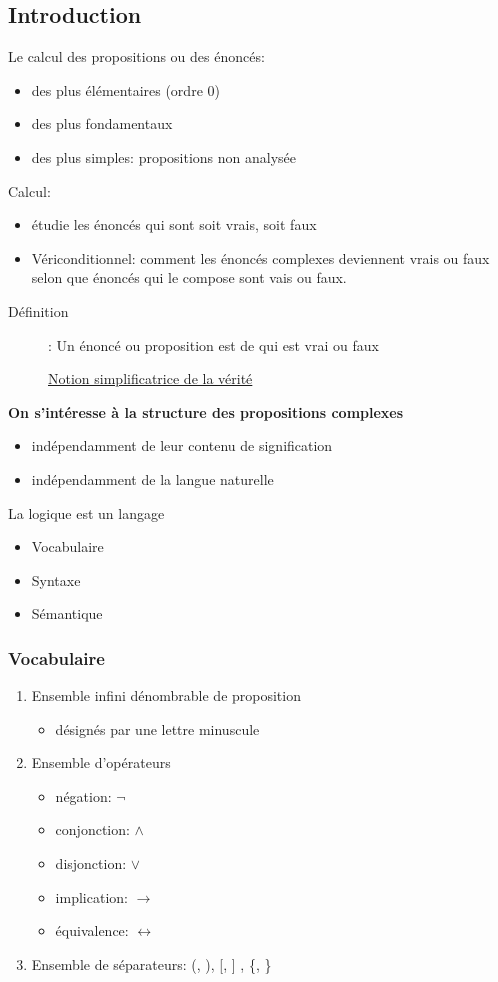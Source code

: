 \documentclass[10pt,a4paper]{article}
\begin{document}
\subsection{Introduction}
Le calcul des propositions ou des énoncés:\begin{itemize}
\item des plus élémentaires (ordre 0)
\item des plus fondamentaux
\item des plus simples: propositions non analysée
\end{itemize}
Calcul: \begin{itemize}
\item étudie les énoncés qui sont soit vrais, soit faux
\item Vériconditionnel: comment les énoncés complexes deviennent vrais ou faux selon que énoncés qui le compose sont vais ou faux.
\end{itemize}
\begin{description}
\item[Définition]: Un énoncé ou proposition est de qui est vrai ou faux
\begin{center}
\underline{Notion simplificatrice de la vérité}
\end{center}
\end{description}
\textbf{On s’intéresse à la structure des propositions complexes}
\begin{itemize}
\item indépendamment de leur contenu de signification
\item indépendamment de la langue naturelle
\end{itemize}
La logique est un langage \begin{itemize}
\item Vocabulaire
\item Syntaxe
\item Sémantique
\end{itemize}
		\subsubsection{Vocabulaire}
		\begin{enumerate}
			\item Ensemble infini dénombrable de proposition
			\begin{itemize}
				\item désignés par une lettre minuscule
			\end{itemize}
			\item Ensemble d'opérateurs
			\begin{itemize}
				\item négation: $\neg$
				\item conjonction: $\wedge$
				\item disjonction: $\vee$
				\item implication: $\rightarrow$
				\item équivalence: $\leftrightarrow$
			\end{itemize}
			\item Ensemble de séparateurs: (, ), [, ] , \{, \}
		\end{enumerate}
\end{document}
